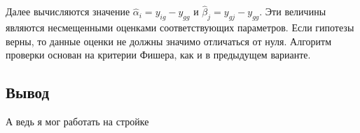 Далее вычисляются значение $\widehat{\alpha}_i = y_{ig}-y_{gg}$ и $\widehat{\beta}_j=y_{gj}-y_{gg}$. Эти величины являются несмещенными оценками соответствующих параметров. Если гипотезы верны, то данные оценки не должны значимо отличаться от нуля. Алгоритм проверки основан на критерии Фишера, как и в предыдущем варианте. \cite{disperMethod}

\subsection*{Вывод}
А ведь я мог работать на стройке

\pagebreak